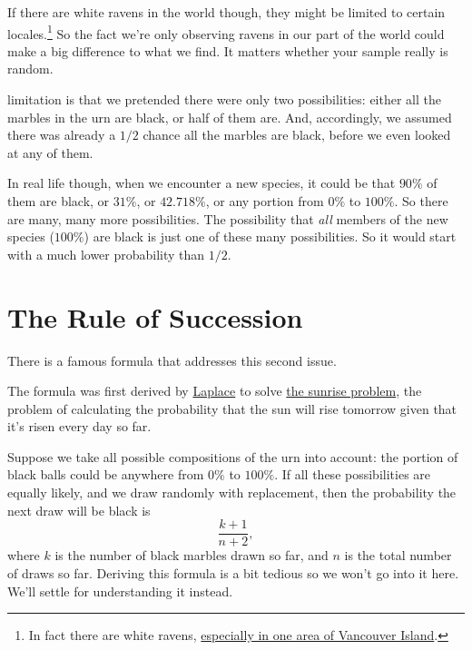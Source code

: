 \documentclass[justified]{tufte-book}
\theoremstyle{definition}
\theoremstyle{definition}
\theoremstyle{definition}
\theoremstyle{definition}
\theoremstyle{remark}
\begin{document}
If there are white ravens in the world though, they might be limited to certain locales.\footnote{In fact there are white ravens, \href{https://vancouversun.com/news/local-news/rare-white-raven-spotted-on-vancouver-island}{especially in one area of Vancouver Island}.} So the fact we're only observing ravens in our part of the world could make a big difference to what we find. It matters whether your sample really is random.

 limitation is that we pretended there were only two possibilities: either all the marbles in the urn are black, or half of them are. And, accordingly, we assumed there was already a \(1/2\) chance all the marbles are black, before we even looked at any of them.

In real life though, when we encounter a new species, it could be that \(90\%\) of them are black, or \(31\%\), or \(42.718\%\), or any portion from \(0\%\) to \(100\%\). So there are many, many more possibilities. The possibility that \emph{all} members of the new species (\(100\%\)) are black is just one of these many possibilities. So it would start with a much lower probability than \(1/2\).

\hypertarget{succession}{%
\section{The Rule of Succession}\label{succession}}

There is a famous formula that addresses this second issue.

\begin{marginfigure}
The formula was first derived by
\protect\hyperlink{fig:laplace}{Laplace} to solve
\href{https://en.wikipedia.org/wiki/Sunrise_problem}{the sunrise
problem}, the problem of calculating the probability that the sun will
rise tomorrow given that it's risen every day so far.
\end{marginfigure}

Suppose we take all possible compositions of the urn into account: the portion of black balls could be anywhere from \(0\%\) to \(100\%\). If all these possibilities are equally likely, and we draw randomly with replacement, then the probability the next draw will be black is
\[ \frac{k + 1}{n + 2},\]
where \(k\) is the number of black marbles drawn so far, and \(n\) is the total number of draws so far. Deriving this formula is a bit tedious so we won't go into it here. We'll settle for understanding it instead.
\end{document}
